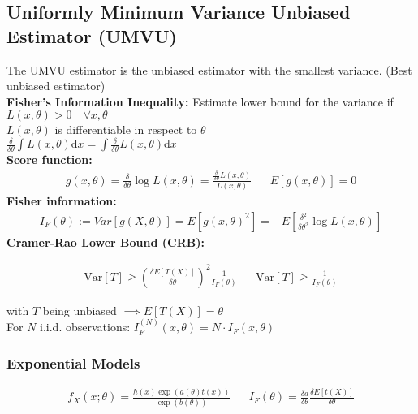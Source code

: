 \newpage
\begin{mdframed}[style=eqbox]
  \subsection{Uniformly Minimum Variance Unbiased Estimator (UMVU)}
  The UMVU estimator is the unbiased estimator with the smallest variance. (Best unbiased estimator)\\[0.25em]
  \textbf{Fisher's Information Inequality:} Estimate lower bound for the variance if\\
  $ L(x, \theta) > 0 \quad \forall x, \theta$\\[0.25em]
  $ L(x, \theta)$ is differentiable in respect to $\theta$\\[0.25em]
  $ \frac{\delta}{\delta \theta} \int L(x, \theta) \text{d}x = \int \frac{\delta}{\delta \theta} L(x, \theta) \text{d}x$\\[0.5em]
  \textbf{Score function:}
  \vspace*{-4pt}
  \begin{align*}
    g(x, \theta) = \frac{\delta}{\delta \theta} \log L(x, \theta) = \frac{\frac{\delta}{\delta \theta} L(x, \theta)}{L(x, \theta)} && E[g(x, \theta)] = 0
  \end{align*}
  \textbf{Fisher information:}
  \vspace*{-4pt}
  \begin{align*}
    I_F(\theta) := Var[g(X, \theta)] = E[g(x, \theta)^2] = -E\left[\frac{\delta^2}{\delta \theta^2} \log L(x, \theta)\right]
  \end{align*}
  \textbf{Cramer-Rao Lower Bound (CRB):}
  \vspace*{-4pt}
  \begin{mdframed}[style=redbox]
    \vspace*{-10pt}
    \begin{align*}
      \text{Var}[T] \geq \left ( \frac{\delta E[T(X)]}{\delta \theta} \right )^2 \frac{1}{I_F(\theta)} && \text{Var}[T] \geq \frac{1}{I_F(\theta)}
    \end{align*}
  \end{mdframed}
  \vspace*{-4pt}\small{with $T$ being unbiased $\implies E[T(X)] = \theta$}\normalsize\\[0.25em]
  For $N$ i.i.d. observations: $I_F^{(N)}(x, \theta) = N \cdot I_F(x, \theta)$
  \subsubsection{Exponential Models}
  \vspace*{-4pt}
  \begin{align*}
    f_X(x; \theta) = \frac{h(x)\exp(a(\theta)t(x))}{\exp(b(\theta))} && I_F(\theta) = \frac{\delta a}{\delta \theta} \frac{\delta E[t(X)]}{\delta \theta}
  \end{align*}

\end{mdframed}
